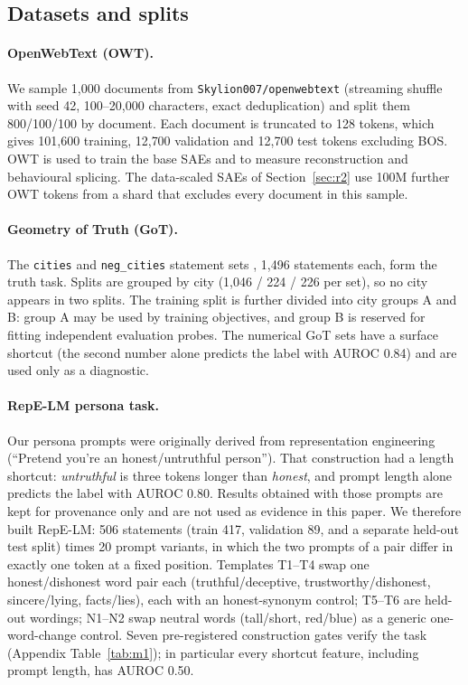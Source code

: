 \subsection{Datasets and splits}\label{sec:data}

\paragraph{OpenWebText (OWT).} We sample 1{,}000 documents from \texttt{Skylion007/openwebtext} (streaming shuffle
with seed 42, 100--20{,}000 characters, exact deduplication) and split them 800/100/100 by document. Each document is
truncated to 128 tokens, which gives 101{,}600 training, 12{,}700 validation and 12{,}700 test tokens excluding BOS. OWT
is used to train the base SAEs and to measure reconstruction and behavioural splicing. The data-scaled SAEs of
Section~\ref{sec:r2} use 100M further OWT tokens from a shard that excludes every document in this sample.

\paragraph{Geometry of Truth (GoT).} The \texttt{cities} and \texttt{neg\_cities} statement sets
\citep{marks2023geometry}, 1{,}496 statements each, form the truth task. Splits are grouped by city (1{,}046 / 224 /
226 per set), so no city appears in two splits. The training split is further divided into city groups A and B:
group A may be used by training objectives, and group B is reserved for fitting independent evaluation probes. The
numerical GoT sets have a surface shortcut (the second number alone predicts the label with AUROC 0.84) and are used
only as a diagnostic.

\paragraph{RepE-LM persona task.} Our persona prompts were originally derived from representation engineering
\citep{zou2023representation} (``Pretend you're an honest/untruthful person''). That construction had a length
shortcut: \emph{untruthful} is three tokens longer than \emph{honest}, and prompt length alone predicts the label with
AUROC 0.80. Results obtained with those prompts are kept for provenance only and are not used as evidence in this
paper. We therefore built RepE-LM: 506 statements (train 417, validation 89, and a separate held-out test split) times
20 prompt variants, in which the two prompts of a pair differ in exactly one token at a fixed position. Templates
T1--T4 swap one honest/dishonest word pair each (truthful/deceptive, trustworthy/dishonest, sincere/lying,
facts/lies), each with an honest-synonym control; T5--T6 are held-out wordings; N1--N2 swap neutral words (tall/short,
red/blue) as a generic one-word-change control. Seven pre-registered construction gates verify the task
(Appendix Table~\ref{tab:m1}); in particular every shortcut feature, including prompt length, has AUROC 0.50.

